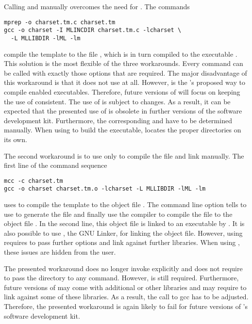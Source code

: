 Calling \Mprep and \Gcc manually overcomes the need for \Mcc. The commands
\begin{verbatim}
mprep -o charset.tm.c charset.tm
gcc -o charset -I MLINCDIR charset.tm.c -lcharset \
  -L MLLIBDIR -lML -lm
\end{verbatim}
compile the  template to the \C file , which is in turn compiled to the executable . This solution is the most flexible of the three workarounds. Every command can be called with exactly those options that are required. The major disadvantage of this workaround is that it does not use \Mcc at all. However, \Mcc is the \MathLink's proposed way to compile \MathLink enabled executables. Therefore, future versions of \MathLink will focus on keeping the use of \Mcc consistent. The use of \Mprep is subject to changes. As a result, it can be expected that the presented use of \Mprep is obsolete in further versions of the \MathLink \C software development kit. Furthermore, the corresponding  and  have to be determined manually. When using \Mcc to build the executable, \Mcc locates the proper directories on its own.

The second workaround is to use \Mcc only to compile the file and link manually. The first line of the command sequence
\begin{verbatim}
mcc -c charset.tm
gcc -o charset charset.tm.o -lcharset -L MLLIBDIR -lML -lm
\end{verbatim}
uses \Mcc to compile the template  to the object file . The command line option  tells \Mcc to use \Mprep to generate the \C file  and finally use the \C compiler to compile the \C file to the object file . In the second line, this object file is linked to an executable by \Gcc. It is also possible to use \Ld, the GNU Linker, for linking the object file. However, using \Ld requires to pass further options and link against further libraries. When using \Gcc, these issues are hidden from the user. 

The presented workaround does no longer invoke \Mprep explicitly and does not require to pass the directory  to any command. However,  is still required. Furthermore, future versions of \MathLink may come with additional or other libraries and may require to link against some of these libraries. As a result, the call to gcc has to be adjusted. Therefore, the presented workaround is again likely to fail for future versions of \MathLink's \C software development kit.

